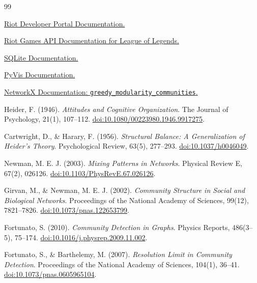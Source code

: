 ﻿\documentclass[a4paper,12pt]{report}
\begin{document}
\begin{thebibliography}{99}

\href{https://developer.riotgames.com/docs/portal}{Riot Developer Portal Documentation.}

\href{https://developer.riotgames.com/docs/lol}{Riot Games API Documentation for League of Legends.}

\href{https://www.sqlite.org/docs.html}{SQLite Documentation.}

\href{https://pyvis.readthedocs.io/en/latest/documentation.html}{PyVis Documentation.}

\href{https://networkx.org/documentation/stable/reference/algorithms/generated/networkx.algorithms.community.modularity_max.greedy_modularity_communities.html}{NetworkX Documentation: \texttt{greedy\_modularity\_communities}.}

Heider, F. (1946). \textit{Attitudes and Cognitive Organization}. The Journal of Psychology, 21(1), 107--112. \href{https://doi.org/10.1080/00223980.1946.9917275}{doi:10.1080/00223980.1946.9917275}.

Cartwright, D., \& Harary, F. (1956). \textit{Structural Balance: A Generalization of Heider's Theory}. Psychological Review, 63(5), 277--293. \href{https://doi.org/10.1037/h0046049}{doi:10.1037/h0046049}.

Newman, M. E. J. (2003). \textit{Mixing Patterns in Networks}. Physical Review E, 67(2), 026126. \href{https://doi.org/10.1103/PhysRevE.67.026126}{doi:10.1103/PhysRevE.67.026126}.

Girvan, M., \& Newman, M. E. J. (2002). \textit{Community Structure in Social and Biological Networks}. Proceedings of the National Academy of Sciences, 99(12), 7821--7826. \href{https://doi.org/10.1073/pnas.122653799}{doi:10.1073/pnas.122653799}.

Fortunato, S. (2010). \textit{Community Detection in Graphs}. Physics Reports, 486(3--5), 75--174. \href{https://doi.org/10.1016/j.physrep.2009.11.002}{doi:10.1016/j.physrep.2009.11.002}.

Fortunato, S., \& Barthelemy, M. (2007). \textit{Resolution Limit in Community Detection}. Proceedings of the National Academy of Sciences, 104(1), 36--41. \href{https://doi.org/10.1073/pnas.0605965104}{doi:10.1073/pnas.0605965104}.


\end{thebibliography}
\end{document}
